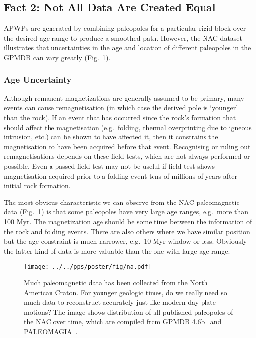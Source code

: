 \subsection{Fact 2: Not All Data Are Created Equal}\label{sec:f2}

APWPs are generated by combining paleopoles for a particular rigid block over
the desired age range to produce a smoothed path. However, the NAC dataset
illustrates that uncertainties in the age and location of different paleopoles
in the GPMDB can vary greatly (Fig.~\ref{Fig:chap_intro_nacpole}).

\subsubsection{Age Uncertainty}\label{sec:ageu}

Although remanent magnetizations are generally assumed to be primary, many
events can cause remagnetisation (in which case the derived pole is `younger'
than the rock). If an event that has occurred since the rock's formation that
should affect the magnetisation (e.g.\ folding, thermal overprinting due to
igneous intrusion, etc.) can be shown to have affected it, then it constrains
the magnetisation to have been acquired before that event. Recognising or ruling
out remagnetisations depends on these field tests, which are not always
performed or possible. Even a passed field test may not be useful if field test
shows magnetisation acquired prior to a folding event tens of millions of years
after initial rock formation.

The most obvious characteristic we can observe from the NAC paleomagnetic data
(Fig.~\ref{Fig:chap_intro_nacpole}) is that some paleopoles have very large age
ranges, e.g.\ more than 100 Myr. The magnetization age should be some time
between the information of the rock and folding events. There are also others
where we have similar position but the age constraint is much narrower, e.g.\ 10
Myr window or less. Obviously the latter kind of data is more valuable than the
one with large age range.

\begin{figure}[H]
  \centering
  \texttt{[image: ../../pps/poster/fig/na.pdf]}
  \captionsetup{width=1\textwidth}
  \caption[All published paleomagnetic data from North America]{Much
    paleomagnetic data has been collected from the North American Craton. For
    younger geologic times, do we really need so much data to reconstruct
    accurately just like modern-day plate motions? The image shows distribution
    of all published paleopoles of the NAC over time, which are compiled from
    GPMDB 4.6b~\citep{P05} and PALEOMAGIA~\citep{V14}.}\label{Fig:chap_intro_nacpole}
\end{figure}

